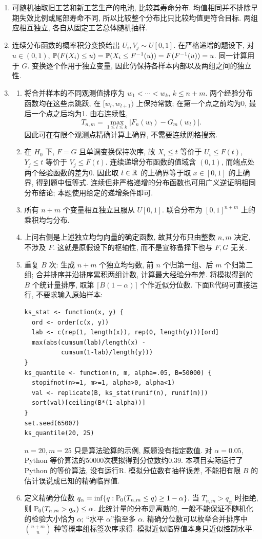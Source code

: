 \begin{solution}
\begin{enumerate}[label=\arabic*.]
\item 可随机抽取旧工艺和新工艺生产的电池, 比较其寿命分布. 均值相同并不排除早期失效比例或尾部寿命不同, 所以比较整个分布比只比较均值更符合目标. 两组应相互独立, 各自从固定工艺总体随机抽样.
\item 连续分布函数的概率积分变换给出 $U_i,V_j\sim U[0,1]$. 在严格递增的题设下, 对 $u\in(0,1)$,
$\mathbb P(F(X_i)\le u)=\mathbb P(X_i\le F^{-1}(u))=F(F^{-1}(u))=u$.
同一计算用于 $G$. 变换逐个作用于独立变量, 因此仍保持各样本内部以及两组之间的独立性.
\item
\begin{enumerate}[label=\alph*)]
\item 将合并样本的不同观测值排序为 $w_1<\cdots<w_k$, $k\le n+m$. 两个经验分布函数均在这些点跳跃, 在 $[w_l,w_{l+1})$ 上保持常数; 在第一个点之前均为0, 最后一个点之后均为1. 由右连续性,
\[
T_{n,m}=\max_{1\le l\le k}|F_n(w_l)-G_m(w_l)|.
\]
因此可在有限个观测点精确计算上确界, 不需要连续网格搜索.
\item 在 $H_0$ 下, $F=G$ 且单调变换保持次序, 故 $X_i\le t$ 等价于 $U_i\le F(t)$, $Y_j\le t$ 等价于 $V_j\le F(t)$. 连续递增分布函数的值域含 $(0,1)$, 而端点处两个经验函数的差为0. 因此取 $t\in\mathbb R$ 的上确界等于取 $x\in[0,1]$ 的上确界, 得到题中恒等式. 连续但非严格递增的分布函数也可用广义逆证明相同分布结论; 本题使用给定的递增条件即可.
\item 所有 $n+m$ 个变量相互独立且服从 $U[0,1]$. 联合分布为 $[0,1]^{n+m}$ 上的乘积均匀分布.
\item 上问右侧是上述独立均匀向量的确定函数, 故其分布只由整数 $n,m$ 决定, 不涉及 $F$. 这就是原假设下的枢轴性, 而不是宣称备择下也与 $F,G$ 无关.
\item 重复 $B$ 次: 生成 $n+m$ 个独立均匀数, 前 $n$ 个归第一组、后 $m$ 个归第二组; 合并排序并沿排序累积两组计数, 计算最大经验分布差. 将模拟得到的 $B$ 个统计量排序, 取第 $\lceil B(1-\alpha)\rceil$ 个作近似分位数. 下面R代码可直接运行, 不要求输入原始样本:
\begin{verbatim}
ks_stat <- function(x, y) {
  ord <- order(c(x, y))
  lab <- c(rep(1, length(x)), rep(0, length(y)))[ord]
  max(abs(cumsum(lab)/length(x) -
          cumsum(1-lab)/length(y)))
}
ks_quantile <- function(n, m, alpha=.05, B=50000) {
  stopifnot(n>=1, m>=1, alpha>0, alpha<1)
  val <- replicate(B, ks_stat(runif(n), runif(m)))
  sort(val)[ceiling(B*(1-alpha))]
}
set.seed(65007)
ks_quantile(20, 25)
\end{verbatim}
$n=20,m=25$ 只是算法验算的示例, 原题没有指定数值. 对 $\alpha=0.05$, Python 等价算法的50000次模拟得到分位数约0.39. 本项目实际运行了 Python 的等价算法, 没有运行R. 模拟分位数有抽样误差, 不能把有限 $B$ 的估计误说成已知的精确临界值.
\item 定义精确分位数 $q_\alpha=\inf\{q:\mathbb P_0(T_{n,m}\le q)\ge1-\alpha\}$. 当 $T_{n,m}>q_\alpha$ 时拒绝, 则 $\mathbb P_0(T_{n,m}>q_\alpha)\le\alpha$. 此统计量的分布是离散的, 一般不能保证不随机化的检验大小恰为 $\alpha$; “水平 $\alpha$”指至多 $\alpha$. 精确分位数可以枚举合并排序中 $\binom{n+m}{n}$ 种等概率组标签次序求得. 模拟近似临界值本身只近似控制水平.


\end{enumerate}
\end{enumerate}
\end{solution}
